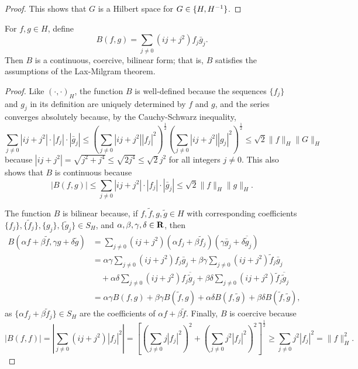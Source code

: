 \documentclass{homework}
\begin{document}
\begin{arabicparts}
\begin{proof}
			This shows that $G$ is a Hilbert space for $G \in \{H, {H^{-1}}\}$.
		\end{proof}
		
		\questionpart
		For $f,g \in H$, define
		\begin{equation}
			B(f,g) = \sum_{j\ne 0}(ij + j^2)f_j\bar{g}_j.
		\end{equation}
		Then $B$ is a continuous, coercive, bilinear form; that is, $B$ satisfies the assumptions of the Lax-Milgram theorem.
		
		\begin{proof}
			Like $(\cdot,\cdot)_H$, the function $B$ is well-defined because the sequences $\{f_j\}$ and $g_j$ in its definition are uniquely determined by $f$ and $g$, and the series converges absolutely because, by the Cauchy-Schwarz inequality,
			\begin{equation}
				\sum_{j\ne 0}|ij+j^2|\cdot|f_j|\cdot|\bar{g}_j| \le \left(\sum_{j\ne0}|ij+j^2||f_j|^2\right)^\frac{1}{2}\left(\sum_{j\ne0}|ij+j^2||g_j|^2\right)^\frac{1}{2} \le \sqrt{2}\lVert f\rVert_H\lVert G\rVert_H
			\end{equation}
			because $|ij+j^2| = \sqrt{j^2 +j^4}\le\sqrt{2j^4} \le \sqrt{2}j^2$ for all integers $j \ne0$. This also shows that $B$ is continuous because
			\begin{equation}
				|B(f,g)| \le \sum_{j\ne 0}|ij+j^2|\cdot |f_j|\cdot|\bar{g}_j| \le \sqrt{2}\lVert f\rVert_H\lVert g\rVert_H.
			\end{equation}
			
			The function $B$ is bilinear because, if $f,\tilde{f}, g, \tilde{g} \in H$ with corresponding coefficients $\{f_j\}, \{\tilde{f}_j\},\{g_j\}, \{\tilde{g}_j\}\in S_H$, and $\alpha,\beta,\gamma,\delta\in\textbf{R}$, then
			\begin{align}
				B(\alpha f+\beta\tilde{f}, \gamma g + \delta \tilde{g}) &= \sum_{j\ne0}(ij + j^2)(\alpha f_j + \beta \tilde{f}_j)(\gamma\bar{g}_j + \delta\overline{\tilde{g}}_j) \\
				&= \alpha\gamma\sum_{j\ne0}(ij+j^2)f_j\bar{g}_j + \beta\gamma\sum_{j\ne 0}(ij+j^2)\tilde{f}_j\bar{g}_j \\
				&\quad{}+\alpha\delta \sum_{j\ne0}(ij+j^2)f_j\overline{\tilde{g}}_j + \beta\delta\sum_{j\ne0}(ij+j^2)\tilde{f}_j\overline{\tilde{g}}_j\\
				&= \alpha\gamma B(f,g) + \beta\gamma B(\tilde{f}, g) + \alpha\delta B(f,\tilde{g}) + \beta\delta B(\tilde{f},\tilde{g}),
			\end{align}
			as $\{\alpha f_j + \beta \tilde{f}_j\} \in S_H$ are the coefficients of $\alpha f + \beta \tilde{f}$.
			Finally, $B$ is coercive because
			\begin{equation}
				|B(f,f)| = \left|\sum_{j\ne0}(ij + j^2)|f_j|^2\right| = \left[\left(\sum_{j\ne 0}j|f_j|^2\right)^2 + \left(\sum_{j\ne0}j^2|f_j|^2\right)^2\right]^\frac{1}{2} \ge \sum_{j\ne0}j^2|f_j|^2 = \lVert f\rVert_H^2.
			\end{equation}
		\end{proof}
		

\end{arabicparts}
\end{document}

